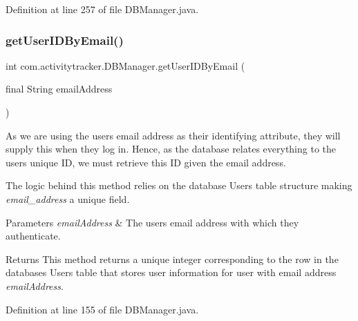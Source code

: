 Definition at line 257 of file D\+B\+Manager.\+java.

\mbox{\label{classcom_1_1activitytracker_1_1_d_b_manager_a195dcdeabdd00facb19d720976dd3f53}} 
\subsubsection{\texorpdfstring{get\+User\+I\+D\+By\+Email()}{getUserIDByEmail()}}
{\footnotesize\ttfamily int com.\+activitytracker.\+D\+B\+Manager.\+get\+User\+I\+D\+By\+Email (\begin{DoxyParamCaption}\item[{final String}]{email\+Address }\end{DoxyParamCaption})}

As we are using the user\textquotesingle{}s email address as their identifying attribute, they will supply this when they log in. Hence, as the database relates everything to the user\textquotesingle{}s unique ID, we must retrieve this ID given the email address.

The logic behind this method relies on the database Users table structure making {\itshape email\+\_\+address} a unique field.


\begin{DoxyParams}{Parameters}
{\em email\+Address} & The user\textquotesingle{}s email address with which they authenticate.\\
\hline
\end{DoxyParams}
\begin{DoxyReturn}{Returns}
This method returns a unique integer corresponding to the row in the database\textquotesingle{}s Users table that stores user information for user with email address {\itshape email\+Address}. 
\end{DoxyReturn}


Definition at line 155 of file D\+B\+Manager.\+java.

\mbox{\label{classcom_1_1activitytracker_1_1_d_b_manager_aab14c61b3f3a17bdea10cab1b5fd9337}} 
